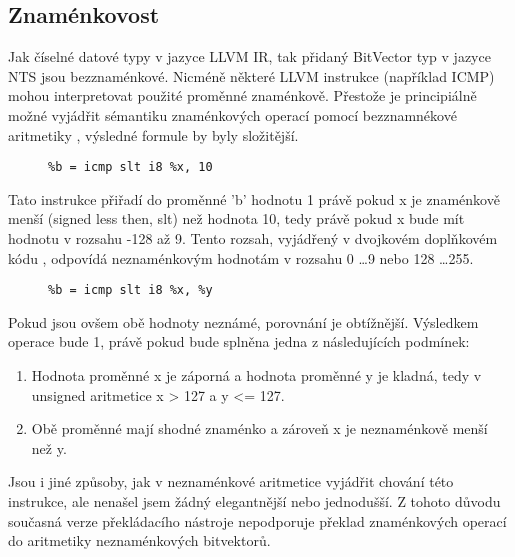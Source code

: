 \documentclass[10pt,a4paper,notitlepage]{report}
\begin{document}
\subsection{Znaménkovost}
Jak číselné datové typy v jazyce LLVM IR, tak přidaný BitVector typ v jazyce NTS jsou bezznaménkové. Nicméně některé LLVM instrukce (například ICMP) mohou interpretovat použité proměnné znaménkově. Přestože je principiálně možné vyjádřit sémantiku znaménkových operací pomocí bezznamnékové aritmetiky , výsledné formule by byly složitější. 
\begin{figure}[h!]
\begin{lstlisting}
%b = icmp slt i8 %x, 10
\end{lstlisting}
\end{figure}
Tato instrukce přiřadí do proměnné 'b' hodnotu 1 právě pokud x je znaménkově menší (signed less then, slt) než hodnota 10, tedy právě pokud x bude mít hodnotu v rozsahu -128 až 9. Tento rozsah, vyjádřený v dvojkovém doplňkovém kódu , odpovídá neznaménkovým hodnotám v rozsahu 0 \ldots 9 nebo 128 \ldots 255. 

\begin{figure}[h!]
\begin{lstlisting}
%b = icmp slt i8 %x, %y
\end{lstlisting}
\end{figure}

Pokud jsou ovšem obě hodnoty neznámé, porovnání je obtížnější. Výsledkem operace bude 1, právě pokud bude splněna jedna z následujících podmínek:

\begin{enumerate}
\item Hodnota proměnné x je záporná a hodnota proměnné y je kladná, tedy v unsigned aritmetice x > 127 a y <= 127.
\item Obě proměnné mají shodné znaménko a zároveň x je neznaménkově menší než y.
\end{enumerate}

Jsou i jiné způsoby, jak v neznaménkové aritmetice vyjádřit chování této instrukce, ale nenašel jsem žádný elegantnější nebo jednodušší. Z tohoto důvodu současná verze překládacího nástroje nepodporuje překlad znaménkových operací do aritmetiky neznaménkových bitvektorů.
\end{document}
